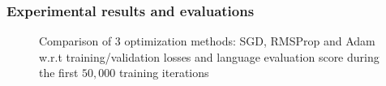 \subsubsection{Experimental results and evaluations}
	\begin{figure}[ht]
		\centering
		\caption[Comparison of $3$ opitmization methods ]{Comparison of $3$ optimization methods: SGD, RMSProp and Adam w.r.t training/validation losses and language evaluation score during the first $50,000$ training iterations}
		\label{fig:exp1} %
	\end{figure}

